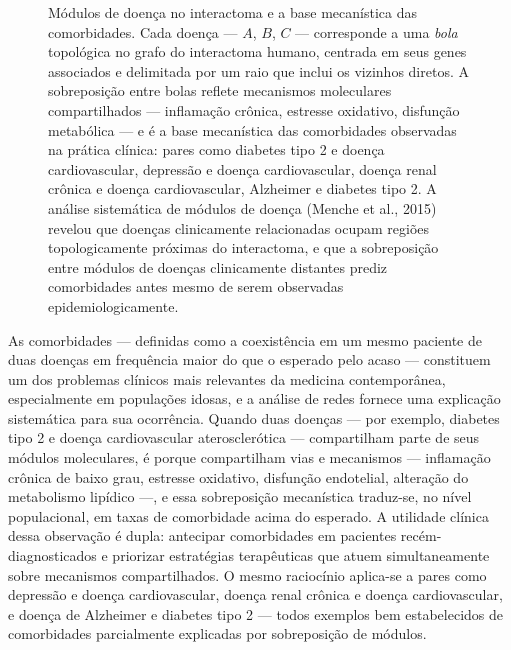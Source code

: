 \begin{figure}[ht]
\caption{Módulos de doença no interactoma e a base mecanística das comorbidades. Cada doença --- $A$, $B$, $C$ --- corresponde a uma \emph{bola} topológica no grafo do interactoma humano, centrada em seus genes associados e delimitada por um raio que inclui os vizinhos diretos. A sobreposição entre bolas reflete mecanismos moleculares compartilhados --- inflamação crônica, estresse oxidativo, disfunção metabólica --- e é a base mecanística das comorbidades observadas na prática clínica: pares como diabetes tipo 2 e doença cardiovascular, depressão e doença cardiovascular, doença renal crônica e doença cardiovascular, Alzheimer e diabetes tipo 2. A análise sistemática de módulos de doença (Menche et al., 2015) revelou que doenças clinicamente relacionadas ocupam regiões topologicamente próximas do interactoma, e que a sobreposição entre módulos de doenças clinicamente distantes prediz comorbidades antes mesmo de serem observadas epidemiologicamente.}
\label{fig:13-modulo}
\end{figure}

As comorbidades --- definidas como a coexistência em um mesmo paciente de duas doenças em frequência maior do que o esperado pelo acaso --- constituem um dos problemas clínicos mais relevantes da medicina contemporânea, especialmente em populações idosas, e a análise de redes fornece uma explicação sistemática para sua ocorrência. Quando duas doenças --- por exemplo, diabetes tipo 2 e doença cardiovascular aterosclerótica --- compartilham parte de seus módulos moleculares, é porque compartilham vias e mecanismos --- inflamação crônica de baixo grau, estresse oxidativo, disfunção endotelial, alteração do metabolismo lipídico ---, e essa sobreposição mecanística traduz-se, no nível populacional, em taxas de comorbidade acima do esperado. A utilidade clínica dessa observação é dupla: antecipar comorbidades em pacientes recém-diagnosticados e priorizar estratégias terapêuticas que atuem simultaneamente sobre mecanismos compartilhados. O mesmo raciocínio aplica-se a pares como depressão e doença cardiovascular, doença renal crônica e doença cardiovascular, e doença de Alzheimer e diabetes tipo 2 --- todos exemplos bem estabelecidos de comorbidades parcialmente explicadas por sobreposição de módulos.

